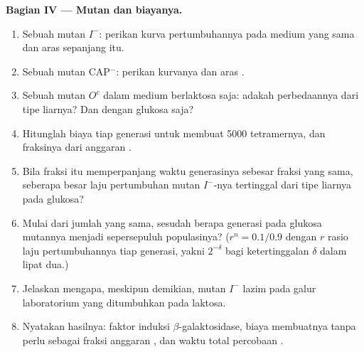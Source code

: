 \begin{problem}
\medskip
\noindent\textbf{Bagian IV --- Mutan dan biayanya.}
\begin{enumerate}[resume]
  \item Sebuah mutan $I^-$: perikan kurva pertumbuhannya pada medium
        yang sama dan aras  sepanjang itu.
  \item Sebuah mutan CAP$^-$: perikan kurvanya dan aras .
  \item Sebuah mutan $O^c$ dalam medium berlaktosa saja: adakah
        perbedaannya dari tipe liarnya? Dan dengan glukosa saja?
  \item Hitunglah biaya  tiap generasi untuk membuat \num{5000}
        tetramernya, dan fraksinya dari anggaran .
  \item Bila fraksi itu memperpanjang waktu generasinya sebesar fraksi
        yang sama, seberapa besar laju pertumbuhan mutan $I^-$-nya
        tertinggal dari tipe liarnya pada glukosa?
  \item Mulai dari jumlah yang sama, sesudah berapa generasi pada
        glukosa mutannya menjadi sepersepuluh populasinya? ($r^n =
        0.1/0.9$ dengan $r$ rasio laju pertumbuhannya tiap generasi,
        yakni $2^{-\delta}$ bagi ketertinggalan $\delta$ dalam lipat
        dua.)
  \item Jelaskan mengapa, meskipun demikian, mutan $I^-$ lazim pada
        galur laboratorium yang ditumbuhkan pada laktosa.
  \item Nyatakan hasilnya: faktor induksi $\beta$-galaktosidase, biaya
        membuatnya tanpa perlu sebagai fraksi anggaran , dan
        waktu total percobaan .
\end{enumerate}
\end{problem}
